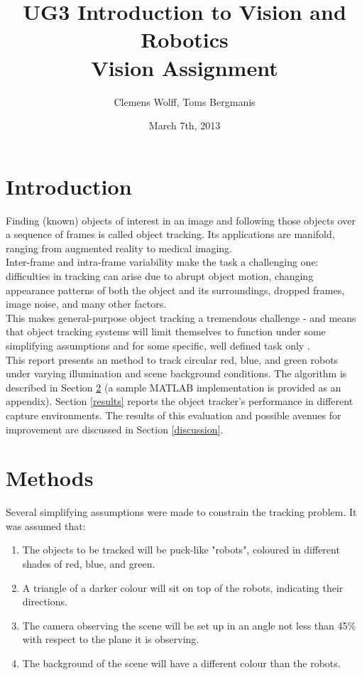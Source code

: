 \documentclass[10pt,a4paper]{article}
\title{UG3 Introduction to Vision and Robotics \\ Vision Assignment}
\author{Clemens Wolff, Toms Bergmanis}
\date{March 7th, 2013}
\begin{document}
\maketitle

\section{Introduction}\label{intro}
Finding (known) objects of interest in an image and following those objects over
a sequence of frames is called object tracking. Its applications are manifold,
ranging from augmented reality to medical imaging.\\
Inter-frame and intra-frame variability make the task a challenging one:
difficulties in tracking can arise due to abrupt object motion, changing 
appearance patterns of both the object and its surroundings, dropped frames,
image noise, and many other factors.\\
This makes general-purpose object tracking a tremendous challenge - and means
that object tracking systems will limit themselves to function under some 
simplifying assumptions and for some specific, well defined task only
\cite{REF}.\\
This report presents an method to track circular red, blue, and green robots 
under varying illumination and scene background conditions. The algorithm is
described in Section \ref{methods} (a sample MATLAB implementation is provided 
as an appendix). Section \ref{results} reports the object tracker's performance
in different capture environments. The results of this evaluation and possible 
avenues for improvement are discussed in Section \ref{discussion}.


\section{Methods}\label{methods}
Several simplifying assumptions were made to constrain the tracking problem.
It was assumed that:
\begin{enumerate}
    \item
    The objects to be tracked will be puck-like "robots", coloured in different
    shades of red, blue, and green.
    \item
    A triangle of a darker colour will sit on top of the robots, indicating
    their directions.
    \item
    The camera observing the scene will be set up in an angle not less than 
    45\% with respect to the plane it is observing. 
    \item
    The background of the scene will have a different colour than the robots.
\end{enumerate}
\end{document}
